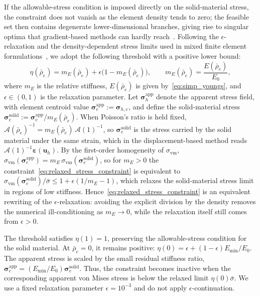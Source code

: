 If the allowable-stress condition is imposed directly on the solid-material stress, the constraint does not vanish as the element density tends to zero; the feasible set then contains degenerate lower-dimensional branches, giving rise to singular optima that gradient-based methods can hardly reach~\cite{Sved1968,Kirsch1990,ChengJiang1992}. Following the $\epsilon$-relaxation and the density-dependent stress limits used in mixed finite element formulations~\cite{Cheng1997,Duysinx1998,BruggiVenini2008}, we adopt the following threshold with a positive lower bound:
\begin{equation}
\label{eq:stress_threshold}
\eta(\bar{\rho}_e) = m_E(\bar{\rho}_e) + \epsilon\bigl(1 - m_E(\bar{\rho}_e)\bigr),
\qquad m_E(\bar{\rho}_e) = \frac{E(\bar{\rho}_e)}{E_0},
\end{equation}
where $m_E$ is the relative stiffness, $E(\bar{\rho}_e)$ is given by~\eqref{eq:simp_youngs}, and $\epsilon \in (0, 1)$ is the relaxation parameter. Let $\boldsymbol{\sigma}_h^{\mathrm{app}}$ denote the apparent stress field, with element centroid value $\boldsymbol{\sigma}_e^{\mathrm{app}} := \boldsymbol{\sigma}_{h,e}$, and define the solid-material stress $\boldsymbol{\sigma}_e^{\mathrm{solid}} := \boldsymbol{\sigma}_e^{\mathrm{app}} / m_E(\bar{\rho}_e)$. When Poisson's ratio is held fixed, $\mathcal{A}(\bar{\rho}_e)^{-1} = m_E(\bar{\rho}_e)\, \mathcal{A}(1)^{-1}$, so $\boldsymbol{\sigma}_e^{\mathrm{solid}}$ is the stress carried by the solid material under the same strain, which in the displacement-based method reads $\mathcal{A}(1)^{-1} \boldsymbol{\varepsilon}(\boldsymbol{u}_h)$. By the first-order homogeneity of $\sigma_{\mathrm{vm}}$, $\sigma_{\mathrm{vm}}(\boldsymbol{\sigma}_e^{\mathrm{app}}) = m_E\, \sigma_{\mathrm{vm}}(\boldsymbol{\sigma}_e^{\mathrm{solid}})$, so for $m_E > 0$ the constraint~\eqref{eq:relaxed_stress_constraint} is equivalent to $\sigma_{\mathrm{vm}}(\boldsymbol{\sigma}_e^{\mathrm{solid}}) / \bar{\sigma} \le 1 + \epsilon(1/m_E - 1)$, which relaxes the solid-material stress limit in regions of low stiffness. Hence~\eqref{eq:relaxed_stress_constraint} is an equivalent rewriting of the $\epsilon$-relaxation: avoiding the explicit division by the density removes the numerical ill-conditioning as $m_E \to 0$, while the relaxation itself still comes from $\epsilon > 0$.

The threshold satisfies $\eta(1)=1$, preserving the allowable-stress condition for the solid material. At $\bar{\rho}_e=0$, it remains positive: $\eta(0)=\epsilon+(1-\epsilon)E_{\min}/E_0$. The apparent stress is scaled by the small residual stiffness ratio, $\boldsymbol{\sigma}_e^{\mathrm{app}}=(E_{\min}/E_0)\boldsymbol{\sigma}_e^{\mathrm{solid}}$. Thus, the constraint becomes inactive when the corresponding apparent von Mises stress is below the relaxed limit $\eta(0)\bar{\sigma}$. We use a fixed relaxation parameter $\epsilon = 10^{-3}$ and do not apply $\epsilon$-continuation.

